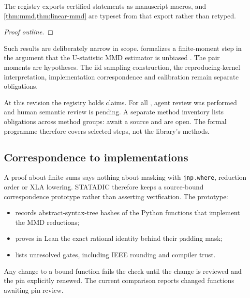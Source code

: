 The registry exports certified statements as manuscript macros, and
\cref{thm:mmd,thm:linear-mmd} are typeset from that export rather than
retyped.

\begin{theorem}\label{thm:mmd}
\end{theorem}
\begin{proof}[Proof outline]
\end{proof}

Such results are deliberately narrow in scope.  formalizes a
finite-moment step in the argument that the U-statistic MMD estimator is
unbiased \citep[Lemma~6]{gretton-etal-2012}. The pair moments are hypotheses.
The iid sampling construction, the reproducing-kernel interpretation,
implementation correspondence and calibration remain separate obligations.

At this revision the registry holds  claims. For all
, agent review was performed and human semantic
review is pending. A separate method
inventory lists  obligations across
 method groups: 
await a source and  are open. The formal programme
therefore covers selected steps, not the library's methods.

\subsection{Correspondence to implementations}

A proof about finite sums says nothing about masking with \texttt{jnp.where},
reduction order or XLA lowering. STATADIC therefore keeps a source-bound
correspondence prototype rather than asserting verification. The prototype:
\begin{itemize}
  \item records abstract-syntax-tree hashes of the 
    Python functions that implement the MMD reductions;
  \item proves in Lean the exact rational identity behind their padding mask;
  \item lists  unresolved gates, including IEEE
    rounding and compiler trust.
\end{itemize}

Any change to a bound function fails the check until the change is reviewed and
the pin explicitly renewed. The current comparison reports
 changed functions awaiting pin review.

